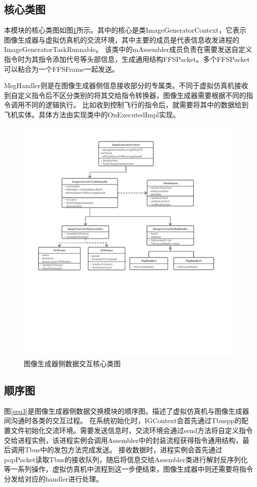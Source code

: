 \subsection{核心类图}

本模块的核心类图如图\ref{module32}所示。其中的核心是类ImageGeneratorContext，它表示图像生成器与虚拟仿真机的交流环境，其中主要的成员是代表信息收发进程的ImageGeneratorTaskRunnable。
该类中的mAssembler成员负责在需要发送自定义指令时为其指令添加代号等头部信息，生成通用结构FFSPacket。多个FFSPacket可以粘合为一个FFSFrame一起发送。
\par
MsgHandler则是在图像生成器侧信息接收部分的专属类。不同于虚拟仿真机接收到自定义指令后不区分类别的将其交给指令转换器，图像生成器需要根据不同的指令调用不同的逻辑执行。
比如收到控制飞行的指令后，就需要将其中的数据给到飞机实体。具体方法由实现类中的OnExecutedImpl实现。
\begin{figure}[h!]
    \begin{center}
        \includegraphics[width=\textwidth]{pictures/classdiagram3.pdf}
        \caption{图像生成器侧数据交互核心类图}
        \label{module32}
    \end{center}
\end{figure}
\subsection{顺序图}
图\ref{seq3}是图像生成器侧数据交换模块的顺序图。描述了虚拟仿真机与图像生成器间沟通时各类的交互过程。
在系统初始化时，IGContext会首先通过Tbuspp的配置文件初始化交流环境。需要发送信息时，交流环境会通过send方法将自定义指令交给进程实例，该进程实例会调用Assembler中的封装流程获得指令通用结构，最后调用Tbus中的发包方法完成发送。
接收数据时，进程实例会首先通过popPacket读取Tbus的接收队列，随后将信息交给Assembler类进行解封反序列化等一系列操作，虚拟仿真机中流程到这一步便结束，图像生成器中则还需要将指令分发给对应的handler进行处理。

